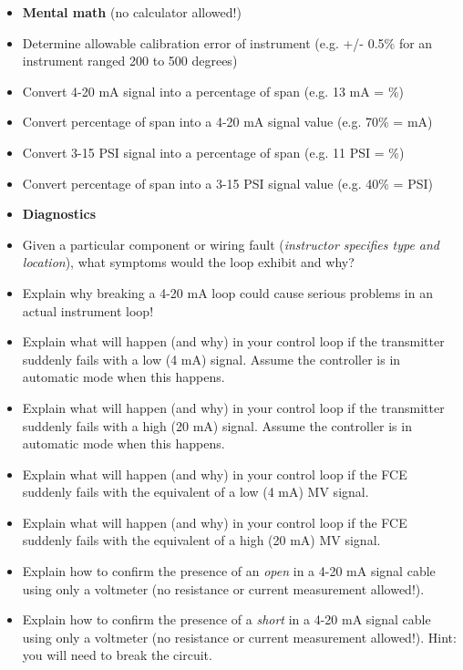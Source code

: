\filbreak

\begin{itemize}
\item{} {\bf Mental math} (no calculator allowed!)
\item{} Determine allowable calibration error of instrument (e.g. +/- 0.5\% for an instrument ranged 200 to 500 degrees)
\item{} Convert 4-20 mA signal into a percentage of span (e.g. 13 mA = \underbar{\hskip 20pt}\%)
\item{} Convert percentage of span into a 4-20 mA signal value (e.g. 70\% = \underbar{\hskip 20pt} mA)
\item{} Convert 3-15 PSI signal into a percentage of span (e.g. 11 PSI = \underbar{\hskip 20pt}\%)
\item{} Convert percentage of span into a 3-15 PSI signal value (e.g. 40\% = \underbar{\hskip 20pt} PSI)
\end{itemize}

\filbreak

\begin{itemize}
\item{} {\bf Diagnostics}
\item{} Given a particular component or wiring fault ({\it instructor specifies type and location}), what symptoms would the loop exhibit and why?
\item{} Explain why breaking a 4-20 mA loop could cause serious problems in an actual instrument loop!
\item{} Explain what will happen (and why) in your control loop if the transmitter suddenly fails with a low (4 mA) signal.  Assume the controller is in automatic mode when this happens.
\item{} Explain what will happen (and why) in your control loop if the transmitter suddenly fails with a high (20 mA) signal.  Assume the controller is in automatic mode when this happens.
\item{} Explain what will happen (and why) in your control loop if the FCE suddenly fails with the equivalent of a low (4 mA) MV signal.
\item{} Explain what will happen (and why) in your control loop if the FCE suddenly fails with the equivalent of a high (20 mA) MV signal.
\item{} Explain how to confirm the presence of an {\it open} in a 4-20 mA signal cable using only a voltmeter (no resistance or current measurement allowed!). 
\item{} Explain how to confirm the presence of a {\it short} in a 4-20 mA signal cable using only a voltmeter (no resistance or current measurement allowed!).  Hint: you will need to break the circuit. 
\end{itemize}





